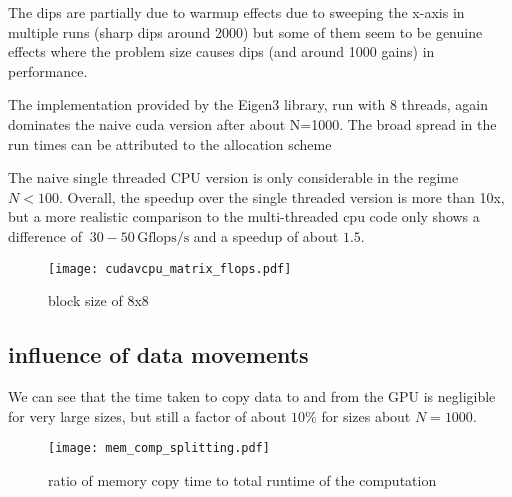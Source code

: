 The dips are partially due to warmup effects due to sweeping the x-axis in multiple runs (sharp dips around 2000) but some of them seem to be genuine effects where the problem size causes dips (and around 1000 gains) in performance.

The implementation provided by the Eigen3 library, run with 8 threads, again dominates the naive cuda version after about N=1000. The broad spread in the run times can be attributed to the allocation scheme 

The naive single threaded CPU version is only considerable in the regime $N<100$. 
Overall, the speedup over the single threaded version is more than 10x, but a more realistic comparison to the multi-threaded cpu code only shows a difference of $~30-50 \, \mathrm{Gflops/s}$ and a speedup of about $1.5$.

\begin{figure}[h!]
\texttt{[image: cudavcpu\_matrix\_flops.pdf]}
\caption{block size of 8x8}
\end{figure}

\subsection{influence of data movements}
We can see that the time taken to copy data to and from the GPU is negligible for very large sizes, but still a factor of about $10\%$ for sizes about $N=1000$. 

\begin{figure}[h!]
    \texttt{[image: mem\_comp\_splitting.pdf]}
    \caption{ratio of memory copy time to total runtime of the computation}
    \end{figure}
